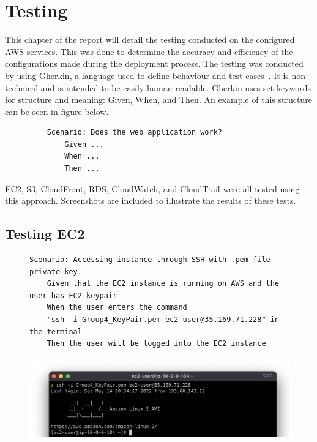 \chapter{Testing}\label{ch:testing}

This chapter of the report will detail the testing conducted on the configured AWS services.
This was done to determine the accuracy and efficiency of the configurations made during the deployment process.
The testing was conducted by using Gherkin, a language used to define behaviour and test
cases~\parencite{dos2018automated}.
It is non-technical and is intended to be easily human-readable.
Gherkin uses set keywords for structure and meaning: Given, When, and Then.
An example of this structure can be seen in figure below.

\begin{figure}[!htbp]
    \centering
    \begin{verbatim}
    Scenario: Does the web application work?
        Given ...
        When ...
        Then ...
    \end{verbatim}
    \label{fig:gherkin}
\end{figure}

EC2, S3, CloudFront, RDS, CloudWatch, and CloudTrail were all tested using this approach.
Screenshots are included to illustrate the results of these tests.

\section{Testing EC2}\label{sec:testing-ec2}

\begin{figure}[!htbp]
    \centering
    \begin{verbatim}
Scenario: Accessing instance through SSH with .pem file private key.
    Given that the EC2 instance is running on AWS and the user has EC2 keypair
    When the user enters the command
    "ssh -i Group4_KeyPair.pem ec2-user@35.169.71.228" in the terminal
    Then the user will be logged into the EC2 instance
    \end{verbatim}
    \label{fig:accessing-instance-ec2}
\end{figure}

\begin{figure}[!htbp]
    \centering
    \includegraphics[width=\textwidth]{resources/ec2/ec2-logged-in}
    \label{fig:ec2-test-logged-in}
\end{figure}

